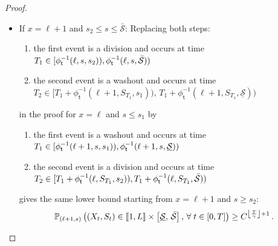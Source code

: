 \documentclass[10pt]{amsart}
\theoremstyle{definition}\newtheorem{defi}[theo]{Definition}\newtheorem{rema}[theo]{Remark}\newtheorem{exam}[theo]{Example}\newtheorem{exem}[theo]{Example}\newtheorem{nota}[theo]{Notation}
\newcommand{\llbracket}{\mathopen{[\mkern -2.7mu[}}
\newcommand{\rrbracket}{\mathclose{]\mkern -2.7mu]}}
\newcommand{\PP}{\mathbb{P}}
\newcommand{\Smin}{\underline{\mathcal{S}}}
\newcommand{\Smax}{\bar{\mathcal{S}}}
\newcommand{\phit}{\phi_\textsf{t}^{-1}}
\newcommand{\setunL}{\llbracket 1, L\rrbracket}
\newcommand{\1}{\mathbf{1}}
\let\oldforall\forall
\renewcommand*{\forall}{\mathrel{\oldforall}}
\begin{document}
\begin{proof}
\begin{itemize}
\item If $x=\ell+1$ and $s_2\leq s\leq \Smax$: Replacing both steps:
\begin{enumerate}
\item the first event is a division and occurs at time $T_1 \in [\phit(\ell,s,s_2)),\linebreak \phit(\ell,s,\Smax))$
\item the second event is a washout and occurs at time \newline $T_2 \in [T_1+\phit(\ell+1,S_{T_1},s_1)),\, T_1+\phit(\ell+1,S_{T_1},\Smin))$
\end{enumerate}
in the proof for $x=\ell$ and $s\leq s_1$ by
\begin{enumerate}
\item the first event is a washout and occurs at time $T_1 \in [\phit(\ell+1,s,s_1)),\linebreak\phit(\ell+1,s,\Smin))$
\item the second event is a division and occurs at time $T_2 \in [T_1+\phit(\ell,S_{T_1},s_2)),\linebreak T_1+\phit(\ell,S_{T_1},\Smax))$
\end{enumerate}
gives the same lower bound starting from $x=\ell+1$ and $s\geq s_2$:
\begin{align}\label{eq.p.fct.s1s2bis}
\PP_{(\ell+1,s)}
\left(\left(X_t,S_t\right) \in \setunL \times \left[\Smin, \, \Smax\right], \,
\forall t\in[0,T]\right) \geq C^{\left\lfloor\frac{T}{\gamma}\right\rfloor+1}\,.
\end{align}



\end{itemize}
\end{proof}
\end{document}
